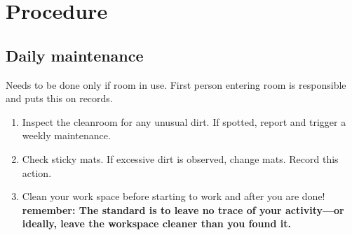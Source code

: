 \documentclass[12pt]{cornelltfpxsop}
\begin{document}

\section{Procedure}

\subsection{Daily maintenance}
Needs to be done only if room in use. First person entering room is responsible and puts this on records.
\begin{enumerate}
    \item Inspect the cleanroom for any unusual dirt. If spotted, report and trigger a weekly maintenance.
    \item Check sticky mats. If excessive dirt is observed, change mats. Record this action.
    \item Clean your work space before starting to work and after you are done!  \textbf{remember: The standard is to leave no trace of your activity—or ideally, leave the workspace cleaner than you found it.}
\end{enumerate}
\end{document}
